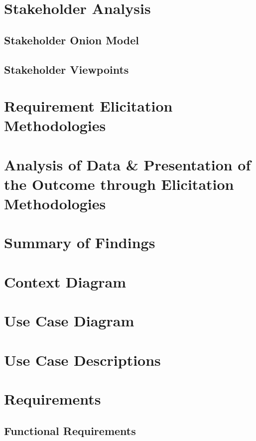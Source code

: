 \section{Stakeholder Analysis}

\subsection{Stakeholder Onion Model}

\subsection{Stakeholder Viewpoints}


\section{Requirement Elicitation Methodologies}

\section{Analysis of Data \& Presentation of the Outcome through Elicitation Methodologies}

\section{Summary of Findings}

\section{Context Diagram}

\section{Use Case Diagram}

\section{Use Case Descriptions}

\section{Requirements}

\subsection{Functional Requirements}

